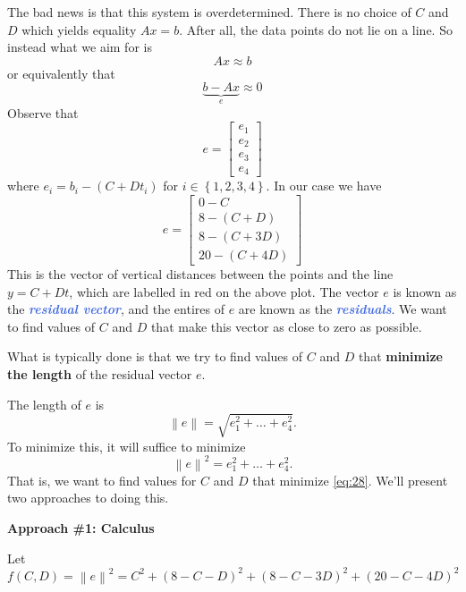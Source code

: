 \documentclass[10pt]{article}
\theoremstyle{definition}
\newcommand{\vt}{\vskip 5mm} %
\newcommand{\Fl}{\vt\noindent\textbf} %
\newcommand{\norm}[1]{\left\lVert#1\right\rVert} %
\newcommand{\1}[1]{\textbf{1}_{\left[#1\right]}} %
\newcommand{\demph}[1]{\textcolor{RoyalBlue}{\textbf{\slshape #1}}} %
\begin{document}
The bad news is that this system is overdetermined. There is no choice of $C$
and $D$ which yields equality $Ax=b$. After all, the data points do not lie on
a line. So instead what we aim for is
\begin{equation*}
  Ax\approx b
\end{equation*}
or equivalently that
\begin{equation*}
  \underbrace{b-Ax}_{e} \approx 0
\end{equation*}
Observe that
\begin{equation*}
  e =
  \begin{bmatrix}
    e_{1}\\
    e_{2}\\
    e_{3}\\
    e_{4}
  \end{bmatrix}
\end{equation*}
where $e_{i} = b_{i}-(C+Dt_{i})$ for $i\in \left\{1,2,3,4\right\}$. In our
case we have
\begin{equation*}
  e =
  \begin{bmatrix}
    0-C\\
    8-(C+D)\\
    8-(C+3D)\\
    20-(C+4D)
  \end{bmatrix}
\end{equation*}
This is the vector of vertical distances between the points and the line
$y=C+Dt$, which are labelled in red on the above plot. The vector $e$ is known
as the \demph{residual vector}, and the entires of $e$ are
known as the \demph{residuals}. We want to find values of $C$ and $D$ that
make this vector as close to zero as possible.

What is typically done is that we try to find values of $C$ and $D$ that
\textbf{minimize the length} of the residual vector $e$.

The length of $e$ is
\begin{equation*}
  \norm{e} = \sqrt{e_{1}^{2}+\ldots+e_{4}^{2}}.
\end{equation*}
To minimize this, it will suffice to minimize
\begin{equation}\label{eq:28}
  \norm{e}^{2} = e_{1}^{2}+\ldots+e_{4}^{2}.
\end{equation}
That is, we want to find values for $C$ and $D$ that minimize \cref{eq:28}.
We'll present two approaches to doing this.

\Fl{Approach \#1: Calculus}

Let
\begin{equation*}
  f(C,D) = \norm{e}^{2} = C^{2}+(8-C-D)^{2}+(8-C-3D)^{2}+(20-C-4D)^{2}
\end{equation*}
\end{document}
